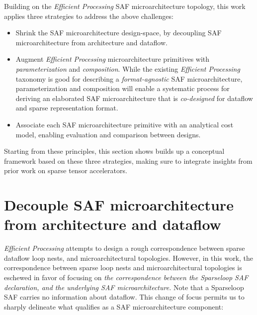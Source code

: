 Building on the \textit{Efficient Processing} SAF microarchitecture topology, this work applies three strategies to address the above challenges: 

\begin{itemize}
    \item Shrink the SAF microarchitecture design-space, by decoupling SAF microarchitecture from architecture and dataflow.
    \item Augment \textit{Efficient Processing} microarchitecture primitives with \textit{parameterization} and \textit{composition}. While the existing \textit{Efficient Processing} taxonomy is good for describing a \textit{format-agnostic} SAF microarchitecture, parameterization and composition will enable a systematic process for deriving an elaborated SAF microarchitecture that is \textit{co-designed} for dataflow and sparse representation format.
    \item Associate each SAF microarchitecture primitive with an analytical cost model, enabling evaluation and comparison between designs.
\end{itemize}



Starting from these principles, this section shows builds up a conceptual framework based on these three strategies, making sure to integrate insights from prior work on sparse tensor accelerators.

\section{Decouple SAF microarchitecture from architecture and dataflow}
\label{sec:what_is_a_saf_microarchitecture}

\textit{Efficient Processing} attempts to design a rough correspondence between sparse dataflow loop nests, and microarchitectural topologies\cite{szebook}. However, in this work, the correspondence between sparse loop nests and microarchitectural topologies is eschewed in favor of focusing on \textit{the correspondence between the Sparseloop\cite{sparseloop} SAF declaration, and the underlying SAF microarchitecture.} Note that a Sparseloop SAF carries no information about dataflow. This change of focus permits us to sharply delineate what qualifies as a SAF microarchitecture component:

